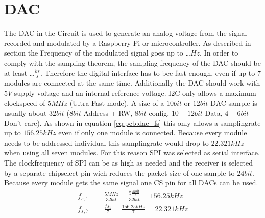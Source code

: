 \section{DAC}
%
%
The DAC in the Circuit is used to generate an analog voltage from the signal recorded and modulated by a Raspberry Pi or microcontroller.\p
%
As described in section  the Frequency of the modulated signal goes up to \dots$Hz$.
In order to comply with the sampling theorem, the sampling frequency of the DAC should be at least \dots$\frac{ks}{s}$. Therefore the digital interface has to bee fast enough, even if up to 7 modules are connected at the same time. Additionally the DAC should work with $5V$ supply voltage and an internal reference voltage.\p
%
I2C only allows a maximum clockspeed of $5MHz$ (Ultra Fast-mode).\cite{nxp_i2c-bus_2021} A size of a $10bit$ or $12bit$ DAC sample is usually about $32bit$ ($8bit$ Address + RW, $8bit$ config, $10 - 12bit$ Data, $4 - 6bit$ Don't care). As shown in equation \ref{eq:pcb:dac_fs} this only allows a samplingrate up to $156.25kHz$ even if only one module is connected. Because every module needs to be addressed individual this samplingrate would drop to $22.321kHz$ when using all seven modules. For this reason SPI was selected as serial interface. The clockfrequency of SPI can be as high as needed and the receiver is selected by a separate chipselect pin wich reduces the packet size of one sample to $24bit$. Because every module gets the same signal one CS pin for all DACs can be used.\p
%
%
\begin{align}
  f_{s,1} &= \frac{5MHz}{32bit} = \frac{5 \frac{Mbit}{s}}{32bit} = 156.25kHz \label{eq:pcb:dac_fs}\\[1em]
  f_{s, 7} &= \frac{fs_1}{7} = \frac{156.25kHz}{7} = 22.321kHz
\end{align}
